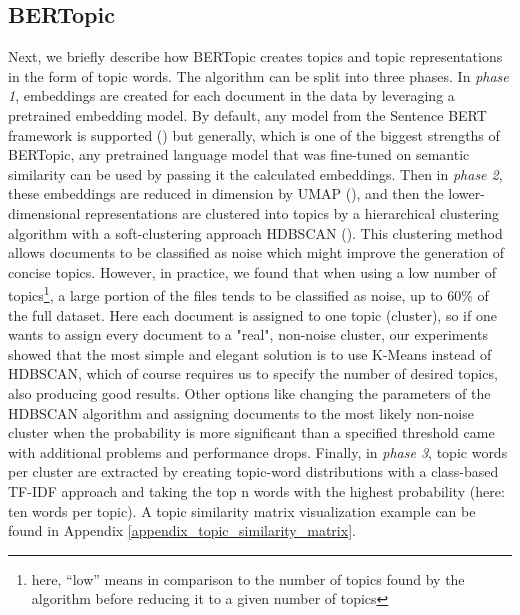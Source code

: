 \documentclass[11pt]{article}
\begin{document}
\subsection{BERTopic}
Next, we briefly describe how BERTopic creates topics and topic representations in the form of topic words. The algorithm can be split into three phases. In \emph{phase 1}, embeddings are created for each document in the data by leveraging a pretrained embedding model. By default, any model from the Sentence BERT framework is supported (\citealp{sbert}) but generally, which is one of the biggest strengths of BERTopic, any pretrained language model that was fine-tuned on semantic similarity can be used by passing it the calculated embeddings. Then in \emph{phase 2}, these embeddings are reduced in dimension by UMAP (\citealp{umap}), and then the lower-dimensional representations are clustered into topics by a hierarchical clustering algorithm with a soft-clustering approach HDBSCAN (\citealp{hdbscan}). This clustering method allows documents to be classified as noise which might improve the generation of concise topics. However, in practice, we found that when using a low number of topics\footnote{here, “low” means in comparison to the number of topics found by the algorithm before reducing it to a given number of topics}, a large portion of the files tends to be classified as noise, up to 60\% of the full dataset. Here each document is assigned to one topic (cluster), so if one wants to assign every document to a "real", non-noise cluster, our experiments showed that the most simple and elegant solution is to use K-Means instead of HDBSCAN, which of course requires us to specify the number of desired topics, also producing good results. Other options like changing the parameters of the HDBSCAN algorithm and assigning documents to the most likely non-noise cluster when the probability is more significant than a specified threshold came with additional problems and performance drops. Finally, in \emph{phase 3}, topic words per cluster are extracted by creating topic-word distributions with a class-based TF-IDF approach and taking the top n words with the highest probability (here: ten words per topic). A topic similarity matrix visualization example can be found in Appendix \ref{appendix_topic_similarity_matrix}.
\end{document}
